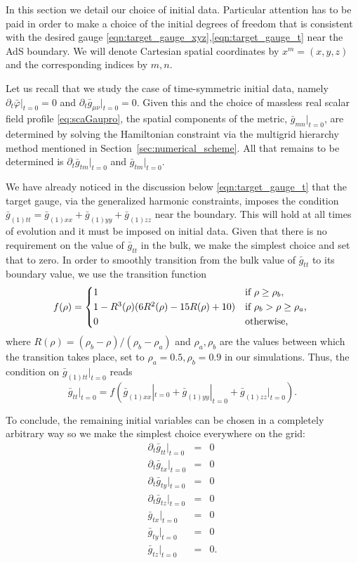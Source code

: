 \documentclass[a4paper,11pt]{article}
\begin{document}
In this section we detail our choice of initial data. 
Particular attention has to be paid in order to make a choice of the initial degrees of freedom that is consistent with the desired gauge \ref{eqn:target_gauge_xyz},\ref{eqn:target_gauge_t} near the AdS boundary. We will denote Cartesian spatial coordinates by $x^m=(x,y,z)$ and the corresponding indices by $m,n$.

Let us recall that we study the case of time-symmetric initial data, namely $\partial_t\bar{\varphi}|_{t=0}=0$ and $\partial_t\bar{g}_{\mu\nu}|_{t=0}=0$. Given this and the choice of massless real scalar field profile \eqref{eq:scaGaupro}, the spatial components of the metric, $\bar{g}_{mn}|_{t=0}$, are determined by solving the Hamiltonian constraint via the multigrid hierarchy method mentioned in Section~\ref{sec:numerical_scheme}.
All that remains to be determined is $\partial_t\bar{g}_{t m}|_{t=0}$ and $\bar{g}_{t m}|_{t=0}$.

We have already noticed in the discussion below \ref{eqn:target_gauge_t} that the target gauge, via the generalized harmonic constraints, imposes the condition $\bar{g}_{(1)tt}=\bar{g}_{(1)xx}+\bar{g}_{(1)yy}+\bar{g}_{(1)zz}$ near the boundary. This will hold at all times of evolution and it must be imposed on initial data. Given that there is no requirement on the value of $\bar{g}_{tt}$ in the bulk, we make the simplest choice and set that to zero. In order to smoothly transition from the bulk value of $\bar{g}_{tt}$ to its boundary value, we use the transition function
  \begin{equation}
  \label{eq:transfunc}
    f(\rho) =
    \begin{cases*}
      1 & if $\rho\geq \rho_{b}$, \\
      1-R^3(\rho)(6 R^2(\rho)-15 R(\rho)+10) & if $\rho_{b} > \rho\geq\rho_{a}$, \\
      0        & otherwise,
    \end{cases*}
  \end{equation}
where $R(\rho)=(\rho_{b}-\rho)/(\rho_{b}-\rho_{a})$ and $\rho_{a},\rho_{b}$ are the values between which the transition takes place, set to $\rho_{a}=0.5,\rho_{b}=0.9$ in our simulations.
Thus, the condition on $\bar{g}_{(1)tt}|_{t=0}$ reads
\begin{equation}
\bar{g}_{tt}|_{t=0}=f(\bar{g}_{(1)xx}|_{t=0}+\bar{g}_{(1)yy}|_{t=0}+\bar{g}_{(1)zz}|_{t=0}).
\end{equation}

To conclude, the remaining initial variables can be chosen in a completely arbitrary way so we make the simplest choice everywhere on the grid:
\begin{eqnarray}
\partial_t\bar{g}_{t t}|_{t=0}&=&0 \\
\partial_t\bar{g}_{t x}|_{t=0}&=&0\\
\partial_t\bar{g}_{t y}|_{t=0}&=&0\\
\partial_t\bar{g}_{t z}|_{t=0}&=&0\\
\bar{g}_{t x}|_{t=0}&=&0 \\
\bar{g}_{t y}|_{t=0}&=&0 \\
\bar{g}_{t z}|_{t=0}&=&0.
\end{eqnarray}
\end{document}
